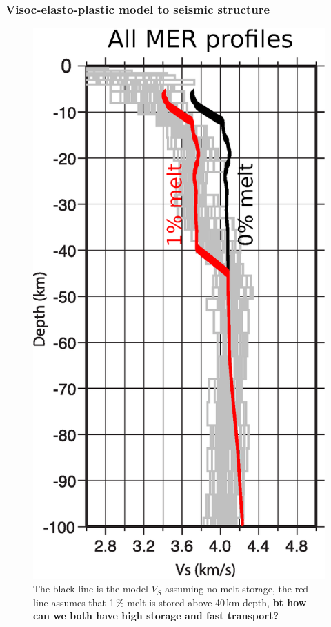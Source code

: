\documentclass[aspectratio=169]{beamer}
\begin{document}
\begin{frame}
    \frametitle{Visoc-elasto-plastic model to seismic structure}
    \begin{figure}
        \includegraphics[height=0.5\paperheight]{./figures/MER2.png}
        \caption{The black line is the model $V_{S}$ assuming no melt storage, the red line
                 assumes that 1\,\% melt is stored above 40\,km depth, {\bf bt how can we both have high storage and fast transport?}}
    \end{figure}
\end{frame}
\end{document}
